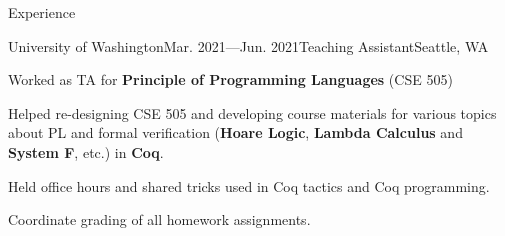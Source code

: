 \documentclass{resume}
\begin{document}
\begin{rSection}{Experience}
		\begin{rSubsection}{University of Washington}{Mar. 2021---Jun. 2021}{Teaching Assistant}{Seattle, WA}
			\item Worked as TA for \textbf{Principle of Programming Languages} (CSE 505)
			\item Helped re-designing CSE 505 and developing course materials for various topics about PL and formal verification (\textbf{Hoare Logic}, \textbf{Lambda Calculus} and \textbf{System F}, etc.) in \textbf{Coq}.
			\item Held office hours and shared tricks used in Coq tactics and Coq programming.
			\item Coordinate grading of all homework assignments.
		\end{rSubsection}


		\vspace{-5pt}


	\end{rSection}
	\vspace{-5pt}
\end{document}
